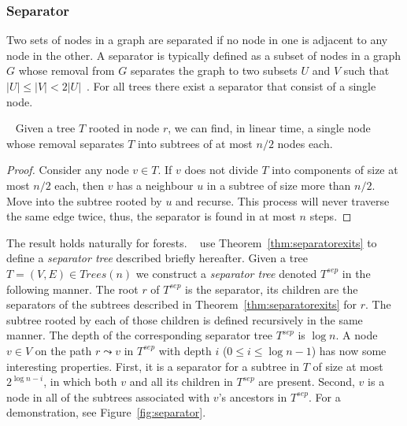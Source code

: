 \subsubsection{Separator}\label{tec:separator}
Two sets of nodes in a graph are separated if  no node in one is adjacent to any node in the other.
A separator is typically defined as a subset of nodes in a graph $G$ whose removal from $G$ separates the graph to two subsets $U$ and $V$
such that $\vert U \vert \leq \vert V \vert < 2 \vert U \vert$~\cite{chung1989separator}.
For all trees there exist a separator that consist of a single node.
\begin{theorem}~\cite{jordan1869assemblages}\label{thm:separatorexits}
Given a tree $T$ rooted in node $r$, we can find, in linear time,  a single node whose removal  separates  $T$ into  subtrees of at most $n/2$ nodes each.
\end{theorem}
\begin{proof}
Consider any node $v \in T$. If $v$ does not divide $T$ into components of size at most $n/2$ each, then $v$ has a neighbour $u$ in a subtree of size more than $n/2$.
 Move into the  subtree rooted by $u$  and recurse. This process will never traverse the same edge twice, thus, the separator is found in at  most $n$ steps.
\end{proof}
The result holds naturally for forests. ~ use Theorem~\ref{thm:separatorexits}  to define a \emph{separator tree} described briefly hereafter.
Given a tree $T=(V,E) \in Trees(n)$ we construct a \emph{separator tree} denoted $T^{sep}$ in the following manner.
The root $r$  of $T^{sep}$ is the separator, its children are the separators of the subtrees  described in  Theorem~\ref{thm:separatorexits} for $r$. The subtree rooted by each of those children is defined recursively in the same manner. The depth of the corresponding separator tree $T^{sep}$ is $\log n$. 
A  node $v \in V$  on the path $r \leadsto v$ in $T^{sep}$ with depth $i$ ($0 \leq i \leq \log n -1$)  has now some interesting properties. 
First, it is a separator for a subtree in $T$  of size at most $2^{\log n- i}$, in which both $v$ and  all its children in $T^{sep}$  are present. 
Second, $v$ is a node in  all of the  subtrees associated with  $v$'s ancestors in $T^{sep}$. 
For a demonstration, see Figure~\ref{fig:separator}.

